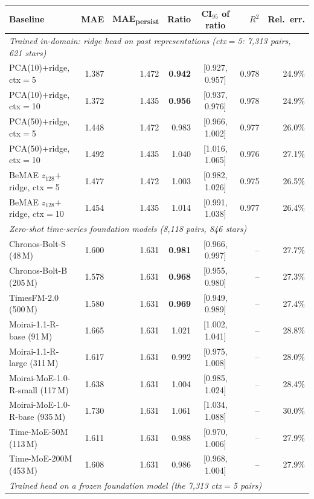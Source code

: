 \begin{tabular}{lrrrcrr}
  \toprule
  Baseline & MAE & MAE\textsubscript{persist} & Ratio & CI$_{95}$ of ratio & $R^2$ & Rel.\ err. \\
  \midrule
  \multicolumn{7}{l}{\emph{Trained in-domain: ridge head on past representations (ctx$=$5: 7{,}313 pairs, 621 stars)}} \\
  PCA(10)$+$ridge, ctx$=$5 & 1.387 & 1.472 & \textbf{0.942} & [0.927, 0.957] & 0.978 & 24.9\% \\
  PCA(10)$+$ridge, ctx$=$10 & 1.372 & 1.435 & \textbf{0.956} & [0.937, 0.976] & 0.978 & 24.9\% \\
  PCA(50)$+$ridge, ctx$=$5 & 1.448 & 1.472 & 0.983 & [0.966, 1.002] & 0.977 & 26.0\% \\
  PCA(50)$+$ridge, ctx$=$10 & 1.492 & 1.435 & 1.040 & [1.016, 1.065] & 0.976 & 27.1\% \\
  BeMAE $z_{128}$$+$ridge, ctx$=$5 & 1.477 & 1.472 & 1.003 & [0.982, 1.026] & 0.975 & 26.5\% \\
  BeMAE $z_{128}$$+$ridge, ctx$=$10 & 1.454 & 1.435 & 1.014 & [0.991, 1.038] & 0.977 & 26.4\% \\
  \midrule
  \multicolumn{7}{l}{\emph{Zero-shot time-series foundation models (8{,}118 pairs, 846 stars)}} \\
  Chronos-Bolt-S (48\,M) & 1.600 & 1.631 & \textbf{0.981} & [0.966, 0.997] & -- & 27.7\% \\
  Chronos-Bolt-B (205\,M) & 1.578 & 1.631 & \textbf{0.968} & [0.955, 0.980] & -- & 27.3\% \\
  TimesFM-2.0 (500\,M) & 1.580 & 1.631 & \textbf{0.969} & [0.949, 0.989] & -- & 27.4\% \\
  Moirai-1.1-R-base (91\,M) & 1.665 & 1.631 & 1.021 & [1.002, 1.041] & -- & 28.8\% \\
  Moirai-1.1-R-large (311\,M) & 1.617 & 1.631 & 0.992 & [0.975, 1.008] & -- & 28.0\% \\
  Moirai-MoE-1.0-R-small (117\,M) & 1.638 & 1.631 & 1.004 & [0.985, 1.024] & -- & 28.4\% \\
  Moirai-MoE-1.0-R-base (935\,M) & 1.730 & 1.631 & 1.061 & [1.034, 1.088] & -- & 30.0\% \\
  Time-MoE-50M (113\,M) & 1.611 & 1.631 & 0.988 & [0.970, 1.006] & -- & 27.9\% \\
  Time-MoE-200M (453\,M) & 1.608 & 1.631 & 0.986 & [0.968, 1.004] & -- & 27.9\% \\
  \midrule
  \multicolumn{7}{l}{\emph{Trained head on a frozen foundation model (the 7{,}313 ctx$=$5 pairs)}} \\

\end{tabular}
